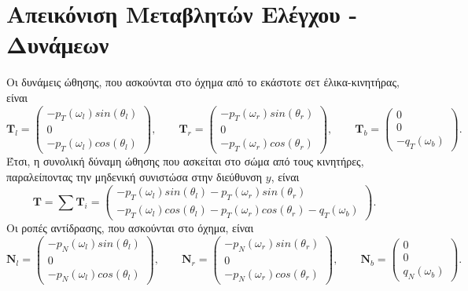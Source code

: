 \section{Απεικόνιση Μεταβλητών Ελέγχου - Δυνάμεων}

Οι δυνάμεις ώθησης, που ασκούνται στο όχημα από το εκάστοτε σετ έλικα-κινητήρας, 
είναι
\begin{equation*}
    \mathbf{T}_l = \begin{pmatrix}
        -p_T(\omega_l)sin(\theta_l) \\
        0                           \\
        -p_T(\omega_l)cos(\theta_l)
    \end{pmatrix},\qquad
    \mathbf{T}_r = \begin{pmatrix}
        -p_T(\omega_r)sin(\theta_r) \\
        0                           \\
        -p_T(\omega_r)cos(\theta_r)
    \end{pmatrix},\qquad
    \mathbf{T}_b = \begin{pmatrix}
        0 \\
        0 \\
        -q_T(\omega_b)
    \end{pmatrix}.
\end{equation*}
Έτσι, η συνολική δύναμη ώθησης που ασκείται στο σώμα από τους κινητήρες, παραλείποντας την μηδενική συνιστώσα στην διεύθυνση $y$, είναι
\begin{equation*}
    \mathbf{T} = \sum \mathbf{T}_i =
    \begin{pmatrix}
        -p_T(\omega_l)sin(\theta_l)-p_T(\omega_r)sin(\theta_r) \\[3pt]
        -p_T(\omega_l)cos(\theta_l) -p_T(\omega_r)cos(\theta_r)-q_T(\omega_b)
    \end{pmatrix}.
\end{equation*}
Οι ροπές αντίδρασης, που ασκούνται στο όχημα, είναι
\begin{equation*}
    \mathbf{N}_l = \begin{pmatrix}
        -p_N(\omega_l)sin(\theta_l) \\
        0                          \\
        -p_N(\omega_l)cos(\theta_l)
    \end{pmatrix},\qquad
    \mathbf{N}_r = \begin{pmatrix}
        -p_N(\omega_r)sin(\theta_r) \\
        0                          \\
        -p_N(\omega_r)cos(\theta_r)
    \end{pmatrix},\qquad
    \mathbf{N}_b = \begin{pmatrix}
        0 \\
        0 \\
        q_N(\omega_b)
    \end{pmatrix}.
\end{equation*}

